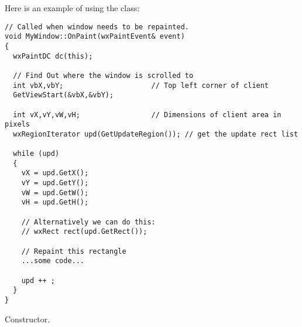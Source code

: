 Here is an example of using the  class:

{\small%
\begin{verbatim}
// Called when window needs to be repainted.
void MyWindow::OnPaint(wxPaintEvent& event)
{
  wxPaintDC dc(this);

  // Find Out where the window is scrolled to
  int vbX,vbY;                     // Top left corner of client
  GetViewStart(&vbX,&vbY);

  int vX,vY,vW,vH;                 // Dimensions of client area in pixels
  wxRegionIterator upd(GetUpdateRegion()); // get the update rect list

  while (upd)
  {
    vX = upd.GetX();
    vY = upd.GetY();
    vW = upd.GetW();
    vH = upd.GetH();

    // Alternatively we can do this:
    // wxRect rect(upd.GetRect());

    // Repaint this rectangle
    ...some code...

    upd ++ ;
  }
}
\end{verbatim}
}%



\label{wxpainteventctor}


Constructor.

